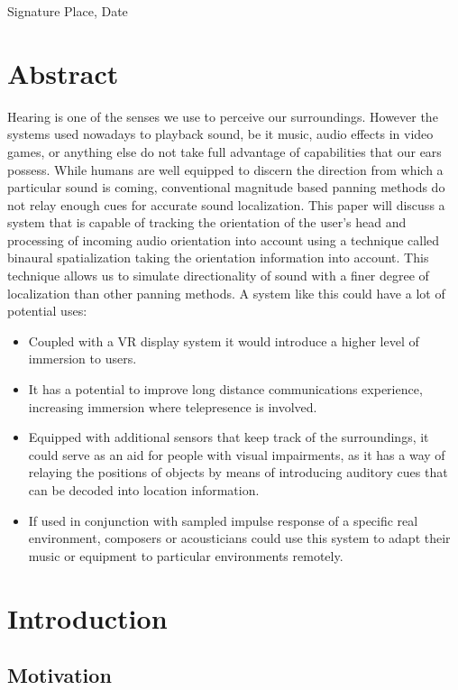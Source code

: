 \documentclass[a4paper,12pt,oneside]{article}
\begin{document}
\vspace{20mm}

Signature \hfill Place, Date

\newpage  
\section*{Abstract}
  
Hearing is one of the senses we use to perceive our surroundings. However the systems used nowadays to playback sound, be it music, audio effects in video games, or anything else do not take full advantage of capabilities that our ears possess. While humans are well equipped to discern the direction from which a particular sound is coming, conventional magnitude based panning methods do not relay enough cues for accurate sound localization. This paper will discuss a system that is capable of tracking the orientation of the user's head and processing of incoming audio  orientation into account using a technique called binaural spatialization taking the orientation information into account. This technique allows us to simulate directionality of sound with a finer degree of localization than other panning methods.  A system like this could have a lot of potential uses:
\begin{itemize}
\item Coupled with a VR display system it would introduce a higher level of immersion to users.
\item It has a potential to improve long distance communications experience, increasing immersion where telepresence is involved. 
\item Equipped with additional sensors that keep track of the surroundings, it could serve as an aid for people with visual impairments, as it has a way of relaying the positions of objects by means of introducing auditory cues that can be decoded into location information.
\item If used in conjunction with sampled impulse response of a specific real environment, composers or acousticians could use this system to adapt their music or equipment to particular environments remotely.
\end{itemize}

\newpage
  \tableofcontents


\section{Introduction}
\subsection{Motivation}
\end{document}
